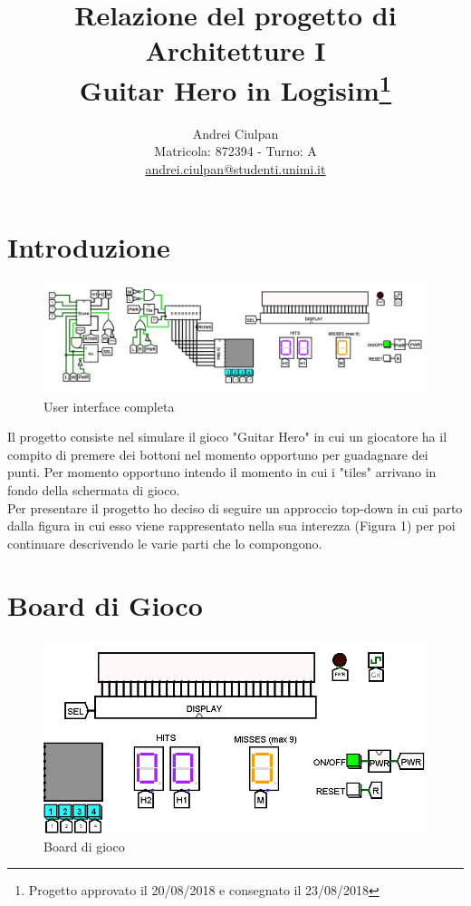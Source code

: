 \documentclass[11pt]{article}
\title{Relazione del progetto di Architetture I\\ Guitar Hero in Logisim\thanks{Progetto approvato il 20/08/2018 e consegnato il 23/08/2018}}
\author{Andrei Ciulpan\\ Matricola: 872394 - Turno: A\\ \url{andrei.ciulpan@studenti.unimi.it}}
\date{}
\begin{document}
\maketitle

\section{Introduzione}

\begin{figure}[!htpb]
\centering
\includegraphics[width=1.3\textwidth, center]{immagini/main}
\caption{User interface completa}
\label{fig:fig1}
\end{figure}

Il progetto consiste nel simulare il gioco "Guitar Hero" in cui un giocatore ha il compito di premere dei bottoni
nel momento opportuno per guadagnare dei punti. Per momento opportuno intendo il momento in cui i "tiles" 
arrivano in fondo della schermata di gioco.
\\Per presentare il progetto ho deciso di seguire un approccio top-down in cui parto dalla figura in  cui esso viene
rappresentato nella sua interezza  (Figura 1)  per poi continuare descrivendo le varie parti che lo compongono.

\pagebreak
\section{Board di Gioco}

\begin{figure}[!htpb]
\centering
\includegraphics[width=1\textwidth, center]{immagini/board_di_gioco_completa}
\caption{Board di gioco}
\label{fig:fig2}
\end{figure}
\end{document}

